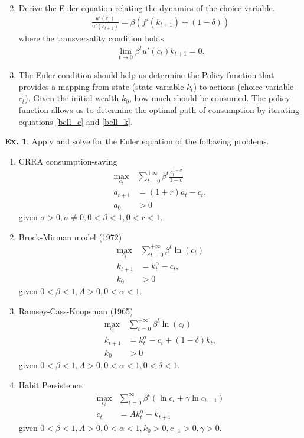 \documentclass[11pt,a4paper]{book}
\theoremstyle{definition}\newtheorem{definition}{Definition}
\theoremstyle{definition}\newtheorem{fact}{Fact}
\theoremstyle{definition}\newtheorem{remark}{Remark}
\theoremstyle{definition}\newtheorem{ex}{Ex.}
\theoremstyle{definition}\newtheorem{project}{Project}
\theoremstyle{definition}\newtheorem{problem}{Problem}
\theoremstyle{definition}\newtheorem{example}{Example}
\numberwithin{theorem}{section}
\numberwithin{corollary}{chapter}
\numberwithin{assumption}{chapter}
\numberwithin{definition}{chapter}
\numberwithin{prop}{chapter}
\numberwithin{notation}{chapter}
\numberwithin{problem}{chapter}
\numberwithin{example}{chapter}
\numberwithin{fact}{chapter}
\numberwithin{ex}{chapter}
\begin{document}
\begin{enumerate}
\begin{align*}
		\end{align*}
		\item Derive the Euler equation relating the dynamics of the choice variable.
		\begin{align*}
			\frac{u'(c_t)}{u'(c_{t+1})} = \beta (f'(k_{t+1}) + (1-\delta))
		\end{align*}
		where the transversality condition holds
		\begin{align*}
			\lim_{t\to 0} \beta^t u'(c_t) k_{t+1} = 0.
		\end{align*}
		\item The Euler condition should help us determine the Policy function that provides a mapping from state (state variable $k_t$) to actions (choice variable $c_t$). Given the initial wealth $k_0$, how much should be consumed. The policy function
		allows us to determine the optimal path of consumption by iterating equations \eqref{bell_c} and \eqref{bell_k}.
	\end{enumerate}
	
	\begin{ex} \label{ex:ramsey}
	Apply and solve for the Euler equation of the following problems.
	\begin{enumerate}
		\item CRRA consumption-saving 
		\begin{align*}
			\max_{c_t} &\sum^{+\infty}_{t=0} \beta^t \frac{c_t^{1-\sigma}}{1-\sigma} \\
			a_{t+1} &= (1+r) a_t - c_t, \\
			a_0 &> 0
		\end{align*}
		given $\sigma > 0, \sigma \neq 0, 0 < \beta  < 1, 0 < r < 1$.
		\item Brock-Mirman model (1972)
		\begin{align*}
			\max_{c_t} &\sum^{+\infty}_{t=0} \beta^t \ln(c_t) \\
			k_{t+1} &= k_t^\alpha - c_t, \\
			k_0 &> 0
		\end{align*}
		given $0 < \beta < 1, A > 0, 0 < \alpha < 1$.
		\item Ramsey-Cass-Koopsman (1965)
		\begin{align*}
			\max_{c_t} &\sum^{+\infty}_{t=0} \beta^t \ln(c_t) \\
			k_{t+1} &= k_t^\alpha - c_t + (1-\delta)k_t, \\
			k_0 &> 0
		\end{align*}
		given $0 < \beta < 1, A > 0, 0 < \alpha < 1, 0 < \delta < 1$.
		\item Habit Persistence \citep[p.8]{manuelli2009exercises}
		\begin{align*}
			\max_{c_t} &\sum^{\infty}_{t=0} \beta^t (\ln c_t + \gamma \ln c_{t-1}) \\
			c_t &= A k_t^\alpha - k_{t+1}
		\end{align*}
		given $0 < \beta < 1, A > 0, 0 < \alpha < 1, k_0 > 0, c_{-1} > 0, \gamma > 0$.
	\end{enumerate}
	\end{ex}
	
\end{document}
